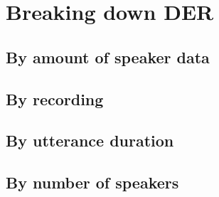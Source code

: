 	\section{Breaking down DER}
		\subsection{By amount of speaker data}
		\subsection{By recording}
		\subsection{By utterance duration}
		\subsection{By number of speakers}